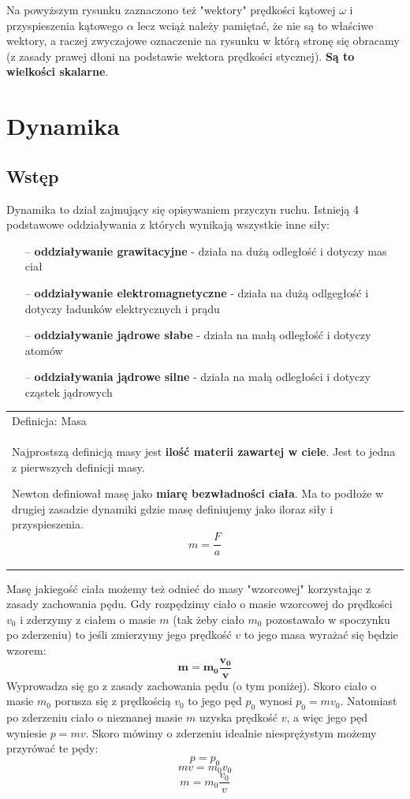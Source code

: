 \documentclass[a4paper]{article}
\newenvironment{definition}[2][Definicja]
    {
        \begin{center}
        \begin{tabular}{|p{1\textwidth}|}
        \hline
            #1: #2\\[2ex]
        \begin{em}
        \Large
    }
    { 
        \end{em}
        \\\hline
        \end{tabular} 
        \end{center}
    }
\begin{document}
    Na powyższym rysunku zaznaczono też "wektory" prędkości kątowej $\omega$ i przyspieszenia kątowego $\alpha$
    lecz wciąż należy pamiętać, że nie są to właściwe wektory, a raczej zwyczajowe oznaczenie na rysunku 
    w którą stronę się obracamy (z zasady prawej dłoni na podstawie wektora prędkości stycznej). 
    \textbf{Są to wielkości skalarne}. 
    \pagebreak
    
    \section{\huge Dynamika}
    \subsection{\LARGE Wstęp}
    Dynamika to dział zajmujący się opisywaniem przyczyn ruchu. Istnieją 4 podstawowe oddziaływania z 
    których wynikają wszystkie inne siły:
    \begin{itemize}
        \item [--] \textbf{oddziaływanie grawitacyjne} - działa na dużą odległość i dotyczy mas ciał
        \item [--] \textbf{oddziaływanie elektromagnetyczne} - działa na dużą odlgegłość i dotyczy ładunków elektrycznych i prądu
        \item [--] \textbf{oddziaływanie jądrowe słabe} - działa na małą odległość i dotyczy atomów
        \item [--] \textbf{oddziaływania jądrowe silne} - działa na małą odległości i dotyczy cząstek jądrowych
    \end{itemize}
    
    \begin{definition}{Masa}
        Najprostszą definicją masy jest \textbf{ilość materii zawartej w ciele}. Jest to jedna z 
        pierwszych definicji masy.
        
        Newton definiował masę jako \textbf{miarę bezwładności ciała}. Ma to podłoże w 
        drugiej zasadzie dynamiki gdzie masę definiujemy jako iloraz siły i przyspieszenia.
        \[m = \frac{F}{a}\]
    \end{definition}  
    Masę jakiegość ciała możemy też odnieć do masy "wzorcowej" korzystając z zasady
    zachowania pędu. Gdy rozpędzimy ciało o masie wzorcowej do prędkości $v_0$ i zderzymy
    z ciałem o masie $m$ (tak żeby ciało $m_0$ pozostawało w spoczynku po zderzeniu) to jeśli
    zmierzymy jego prędkość $v$ to jego masa wyrażać się będzie wzorem:
    \[\mathbf{m = m_0\frac{v_0}{v}}\]
    Wyprowadza się go z zasady zachowania pędu (o tym poniżej). Skoro ciało o masie $m_0$ 
    porusza się z prędkością $v_0$ to jego pęd $p_0$ wynosi $p_0 = mv_0$. Natomiast po zderzeniu
    ciało o nieznanej masie $m$ uzyska prędkość $v$, a więc jego pęd wyniesie $p = mv$.
    Skoro mówimy o zderzeniu idealnie niesprężystym możemy przyrówać te pędy:
    \[ p = p_0\]
    \[ mv = m_0v_0\]
    \[ m = m_0 \frac{v_0}{v}\]
\end{document}
